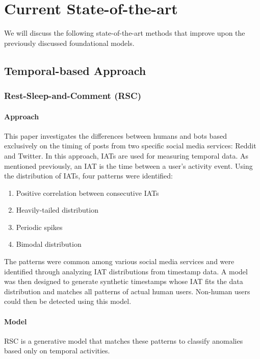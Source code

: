 \documentclass[11pt, oneside]{article}   	%
\begin{document}
\section{Current State-of-the-art}  \label{cur_models}

\quad We will discuss the following state-of-the-art methods that improve upon the previously discussed foundational models.

\subsection{Temporal-based Approach}
\subsubsection{Rest-Sleep-and-Comment (RSC) }

\paragraph{Approach}
\quad

\quad This paper investigates the differences between humans and bots based exclusively on the timing of posts from two specific social media services: Reddit and Twitter. In this approach,\cite{rsc}
IATs are used for measuring temporal data. As mentioned previously, an IAT is the time between a user's activity event.
Using the distribution of IATs, four patterns were identified:
\begin{enumerate}
	\item Positive correlation between consecutive IATs
	\item Heavily-tailed distribution
	\item Periodic spikes
	\item Bimodal distribution
\end{enumerate}
\quad The patterns were common among various social media services and were identified through analyzing IAT distributions from timestamp data.
A model was then designed to generate synthetic timestamps whose IAT fits the data distribution and matches all patterns of actual human users.
Non-human users could then be detected using this model.

\paragraph*{Model}
\quad

\quad RSC is a generative model that matches these patterns to classify anomalies based only on temporal activities.
\end{document}
